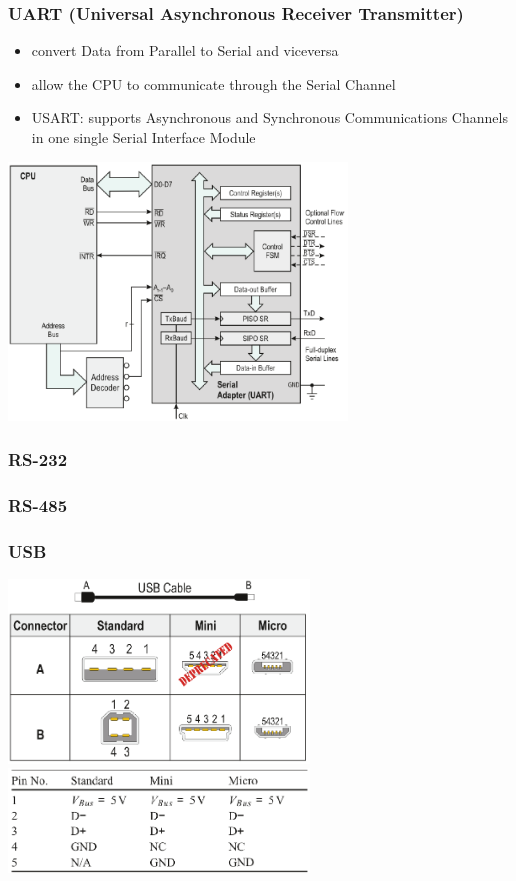 \subsubsection{UART (Universal Asynchronous Receiver Transmitter)}
\begin{minipage}{10cm}
	\begin{itemize}
		\item convert Data from Parallel to Serial and viceversa
		\item allow the CPU to communicate through the Serial Channel
		\item USART: supports Asynchronous and Synchronous Communications Channels in one single Serial Interface Module
	\end{itemize}
\end{minipage}
\begin{minipage}{9cm}
	\includegraphics[width=9cm]{images/uart.png}
\end{minipage}


\subsubsection{RS-232}
\subsubsection{RS-485}
\subsubsection{USB}
\begin{multicols}{2}
	\includegraphics[width=8cm]{images/usb_jacks.png}\\
	\includegraphics[width=8cm]{images/usb_voltage.png}\\
\end{multicols}
\clearpage
\pagebreak